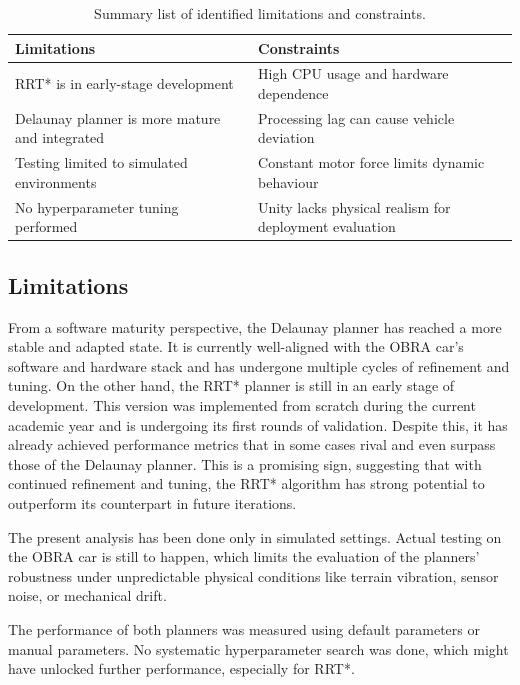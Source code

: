 \documentclass[a4paper,11pt]{report}
\begin{document}
\begin{table}[H]
    \centering
    \begin{tabular}{|p{6cm}|p{6cm}|}
    \hline
    \textbf{Limitations} & \textbf{Constraints} \\
    \hline
    RRT* is in early-stage development & High CPU usage and hardware dependence \\
    \hline
    Delaunay planner is more mature and integrated & Processing lag can cause vehicle deviation \\
    \hline
    Testing limited to simulated environments & Constant motor force limits dynamic behaviour \\
    \hline
    No hyperparameter tuning performed & Unity lacks physical realism for deployment evaluation \\
    \hline
    \end{tabular}
    \caption{Summary list of identified limitations and constraints.}
    \label{tab:limitations_constraints_summary}
\end{table}

\subsection{Limitations}

From a software maturity perspective, the Delaunay planner has reached a more stable and adapted state. 
It is currently well-aligned with the OBRA car’s software and hardware stack and has undergone multiple cycles 
of refinement and tuning. On the other hand, the RRT* planner is still in an early stage of development.
This version was implemented from scratch during the current academic year and is undergoing its first rounds of validation.
Despite this, it has already achieved performance metrics that in some cases rival and even surpass those of the Delaunay planner. 
This is a promising sign, suggesting that with continued refinement and tuning, the RRT* algorithm has strong potential to outperform its counterpart in future iterations.

The present analysis has been done only in simulated settings. Actual testing on 
the OBRA car is still to happen, which limits the evaluation of the planners' robustness under unpredictable physical 
conditions like terrain vibration, sensor noise, or mechanical drift.

The performance of both planners was measured using default parameters or manual parameters. No systematic hyperparameter 
search was done, which might have unlocked further performance, especially for RRT*.
\end{document}
